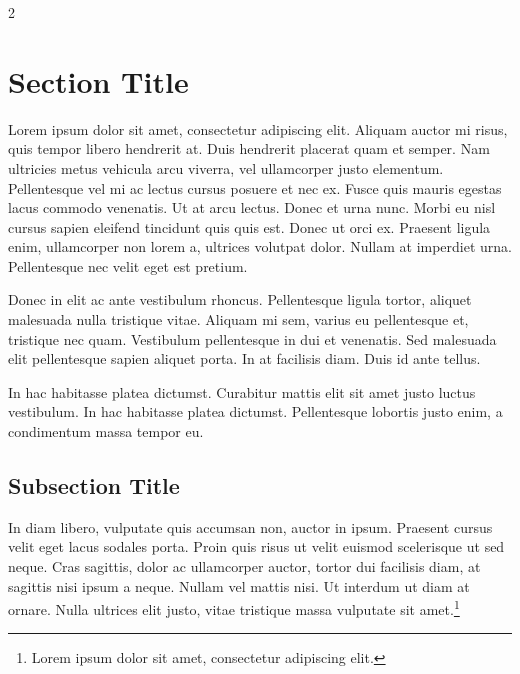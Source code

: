 \documentclass[
	a4paper, %
]{CSMakotoTechnicalReport}
\begin{document}
\begin{multicols}{2} %


\tableofcontents %


\section{Section Title} %

Lorem ipsum dolor sit amet, consectetur adipiscing elit. Aliquam auctor mi risus, quis tempor libero hendrerit at. Duis hendrerit placerat quam et semper. Nam ultricies metus vehicula arcu viverra, vel ullamcorper justo elementum. Pellentesque vel mi ac lectus cursus posuere et nec ex. Fusce quis mauris egestas lacus commodo venenatis. Ut at arcu lectus. Donec et urna nunc. Morbi eu nisl cursus sapien eleifend tincidunt quis quis est. Donec ut orci ex. Praesent ligula enim, ullamcorper non lorem a, ultrices volutpat dolor. Nullam at imperdiet urna. Pellentesque nec velit eget est pretium.

Donec in elit ac ante vestibulum rhoncus. Pellentesque ligula tortor, aliquet malesuada nulla tristique vitae. Aliquam mi sem, varius eu pellentesque et, tristique nec quam. Vestibulum pellentesque in dui et venenatis. Sed malesuada elit pellentesque sapien aliquet porta. In at facilisis diam. Duis id ante tellus.

In hac habitasse platea dictumst. Curabitur mattis elit sit amet justo luctus vestibulum. In hac habitasse platea dictumst. Pellentesque lobortis justo enim, a condimentum massa tempor eu.

\subsection{Subsection Title} %

In diam libero, vulputate quis accumsan non, auctor in ipsum. Praesent cursus velit eget lacus sodales porta. Proin quis risus ut velit euismod scelerisque ut sed neque. Cras sagittis, dolor ac ullamcorper auctor, tortor dui facilisis diam, at sagittis nisi ipsum a neque. Nullam vel mattis nisi. Ut interdum ut diam at ornare. Nulla ultrices elit justo, vitae tristique massa vulputate sit amet.\footnote{Lorem ipsum dolor sit amet, consectetur adipiscing elit.}


\end{multicols}
\end{document}
